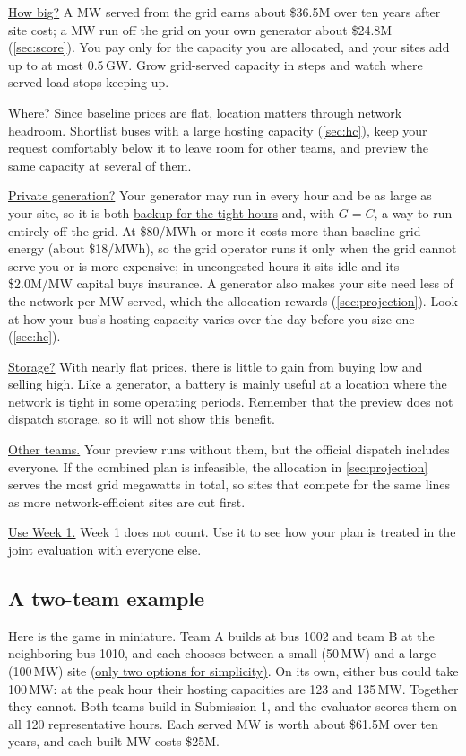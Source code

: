 \documentclass[10pt]{article}
\newcommand{\alert}[1]{{\color{alertblue}\uline{#1}}}
\newcommand{\MW}{\ensuremath{\,\mathrm{MW}}}
\begin{document}
\alert{How big?} A MW served from the grid earns about \$36.5M over ten
years after site cost; a MW run off the grid on your own generator about
\$24.8M (\cref{sec:score}). You pay only for the capacity you are allocated,
and your sites add up to at most 0.5\,GW. Grow grid-served capacity in steps
and watch where served load stops keeping up.

\alert{Where?} Since baseline prices are flat, location matters through
network headroom. Shortlist buses with a large hosting capacity
(\cref{sec:hc}), keep your request comfortably below it to leave room for other
teams, and preview the same capacity at several of them.

\alert{Private generation?} Your generator may run in every hour and be as
large as your site, so it is both \alert{backup for the tight hours} and, with
$G = C$, a way to run entirely off the grid. At \$80/MWh or more it costs more
than baseline grid energy (about \$18/MWh), so the grid operator runs it only
when the grid cannot serve you or is more expensive; in uncongested hours it
sits idle and its \$2.0M/MW capital buys insurance. A generator also makes
your site need less of the network per MW served, which the allocation
rewards (\cref{sec:projection}). Look at how your bus's hosting capacity
varies over the day before you size one (\cref{sec:hc}).

\alert{Storage?} With nearly flat prices, there is little to gain from buying
low and selling high. Like a generator, a battery is mainly useful at a
location where the network is tight in some operating periods. Remember that the preview
does not dispatch storage, so it will not show this benefit.

\alert{Other teams.} Your preview runs without them, but the official
dispatch includes everyone. If the combined plan is infeasible, the allocation
in \cref{sec:projection} serves the most grid megawatts in total, so sites that
compete for the same lines as more network-efficient sites are cut first.

\alert{Use Week 1.} Week 1 does not count. Use it to see how your plan is
treated in the joint evaluation with everyone else.

\subsection{A two-team example}\label{sec:twoteam}
Here is the game in miniature. Team A builds
at bus 1002 and team B at the neighboring bus 1010, and each chooses between a
small (50\MW) and a large (100\MW) site \alert{(only two options for simplicity)}. On its own, either bus could take
100\MW: at the peak hour their hosting capacities are 123 and 135\MW{}.
Together they cannot. Both teams build in Submission 1, and the evaluator
scores them on all 120 representative hours. Each served MW is worth about
\$61.5M over ten years, and each built MW costs \$25M.
\end{document}
